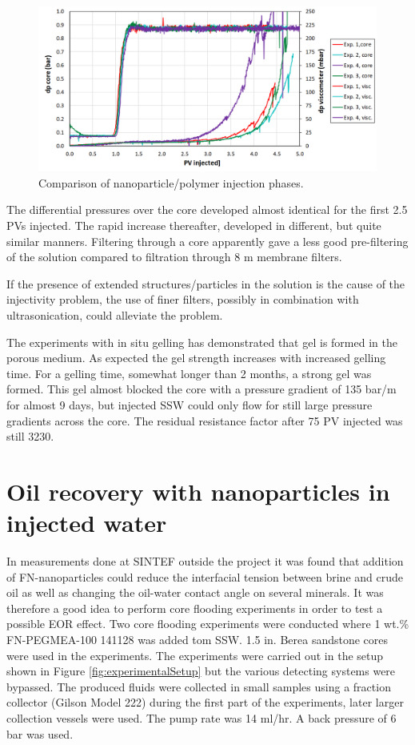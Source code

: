 \begin{figure}[h!]
    \centering
    \includegraphics[width=\textwidth]{img/cht/gelexp_sum.png}
    \caption{Comparison of nanoparticle/polymer injection phases.}
    \label{cht:gelexp_sum} %
\end{figure}
 
The differential pressures over the core developed almost identical for the first 2.5 PVs injected. The rapid increase thereafter, developed in different, but quite similar manners. Filtering through a core apparently gave a less good pre-filtering of the solution compared to filtration through 8 \micro m membrane filters.

If the presence of extended structures/particles in the solution is the cause of the injectivity problem, the use of finer filters, possibly in combination with ultrasonication, could alleviate the problem.

The experiments with in situ gelling has demonstrated that gel is formed in the porous medium. As expected the gel strength increases with increased gelling time. For a gelling time, somewhat longer than 2 months, a strong gel was formed. This gel almost blocked the core with a pressure gradient of 135 bar/m for almost 9 days, but injected SSW could only flow for still large pressure gradients across the core. The residual resistance factor after 75 PV injected was still 3230.

\section{Oil recovery with nanoparticles in injected water}
In measurements done at SINTEF outside the project it was found that addition of FN-nanoparticles could reduce the interfacial tension between brine and crude oil as well as changing the oil-water contact angle on several minerals. It was therefore a good idea to perform core flooding experiments in order to test a possible EOR effect. Two core flooding experiments were conducted where 1 wt.\% FN-PEGMEA-100 141128 was added tom SSW. 1.5 in. Berea sandstone cores were used in the experiments. The experiments were carried out in the setup shown in Figure \ref{fig:experimentalSetup} but the various detecting systems were bypassed. The produced fluids were collected in small samples using a fraction collector (Gilson Model 222) during the first part of the experiments, later larger collection vessels were used. The pump rate was 14 ml/hr. A back pressure of 6 bar was used.


